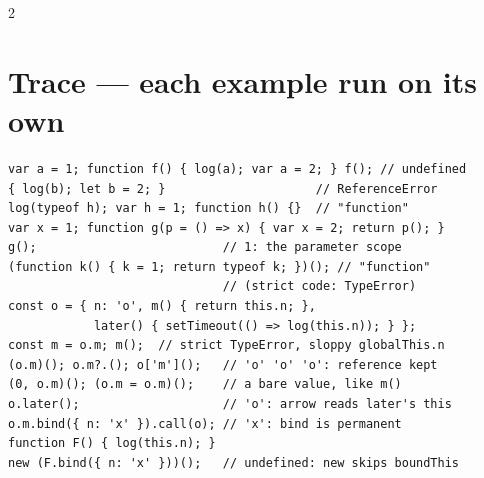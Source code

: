 \documentclass[8pt]{extarticle}
\begin{document}
\begin{multicols}{2}
\section{Trace — each example run on its own}
\begin{lstlisting}[language=TSSheet]
var a = 1; function f() { log(a); var a = 2; } f(); // undefined
{ log(b); let b = 2; }                     // ReferenceError
log(typeof h); var h = 1; function h() {}  // "function"
var x = 1; function g(p = () => x) { var x = 2; return p(); }
g();                          // 1: the parameter scope
(function k() { k = 1; return typeof k; })(); // "function"
                              // (strict code: TypeError)
const o = { n: 'o', m() { return this.n; },
            later() { setTimeout(() => log(this.n)); } };
const m = o.m; m();  // strict TypeError, sloppy globalThis.n
(o.m)(); o.m?.(); o['m']();   // 'o' 'o' 'o': reference kept
(0, o.m)(); (o.m = o.m)();    // a bare value, like m()
o.later();                    // 'o': arrow reads later's this
o.m.bind({ n: 'x' }).call(o); // 'x': bind is permanent
function F() { log(this.n); }
new (F.bind({ n: 'x' }))();   // undefined: new skips boundThis
\end{lstlisting}


\end{multicols}
\end{document}

